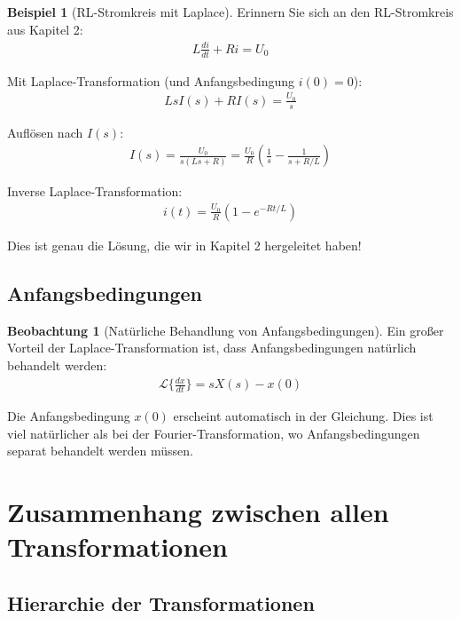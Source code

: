 ﻿\documentclass[a4paper,12pt]{report}
\theoremstyle{definition}
\newtheorem{beispiel}{Beispiel}
\newtheorem{beobachtung}{Beobachtung}
\begin{document}
	\begin{beispiel}[RL-Stromkreis mit Laplace]
		Erinnern Sie sich an den RL-Stromkreis aus Kapitel 2:
		\begin{align}
			L \frac{di}{dt} + R i = U_0
		\end{align}
		
		Mit Laplace-Transformation (und Anfangsbedingung $i(0) = 0$):
		\begin{align}
			L s I(s) + R I(s) = \frac{U_0}{s}
		\end{align}
		
		Auflösen nach $I(s)$:
		\begin{align}
			I(s) = \frac{U_0}{s(Ls + R)} = \frac{U_0}{R} \left(\frac{1}{s} - \frac{1}{s + R/L}\right)
		\end{align}
		
		Inverse Laplace-Transformation:
		\begin{align}
			i(t) = \frac{U_0}{R} \left(1 - e^{-Rt/L}\right)
		\end{align}
		
		Dies ist genau die Lösung, die wir in Kapitel 2 hergeleitet haben!
	\end{beispiel}
	
	\subsection{Anfangsbedingungen}
	
	\begin{beobachtung}[Natürliche Behandlung von Anfangsbedingungen]
		Ein großer Vorteil der Laplace-Transformation ist, dass Anfangsbedingungen natürlich behandelt werden:
		\begin{align}
			\mathcal{L}\{\frac{dx}{dt}\} = s X(s) - x(0)
		\end{align}
		
		Die Anfangsbedingung $x(0)$ erscheint automatisch in der Gleichung. Dies ist viel natürlicher als bei der Fourier-Transformation, wo Anfangsbedingungen separat behandelt werden müssen.
	\end{beobachtung}
	
	\section{Zusammenhang zwischen allen Transformationen}
	
	\subsection{Hierarchie der Transformationen}
	
\end{document}
